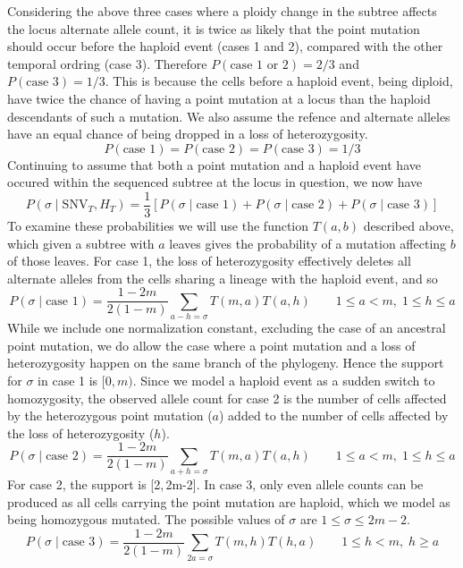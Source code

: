 \documentclass[../main.tex]{subfiles}
\begin{document}
Considering the above three cases where a ploidy change in the subtree affects the locus alternate allele count, it is twice as likely that the point mutation should occur before the haploid event (cases 1 and 2), compared with the other temporal ordring (case 3). Therefore $P(\text{case 1 or 2})=2/3$ and $P(\text{case 3})=1/3$. This is because the cells before a haploid event, being diploid, have twice the chance of having a point mutation at a locus than the haploid descendants of such a mutation. We also assume the refence and alternate alleles have an equal chance of being dropped in a loss of heterozygosity.
\begin{equation*}
P(\text{case 1})=P(\text{case 2}) = P(\text{case 3}) = 1/3
\end{equation*}
Continuing to assume that both a point mutation and a haploid event have occured within the sequenced subtree at the locus in question, we now have
\begin{equation*}
P(\sigma\mid\text{SNV}_T,H_T)=\frac{1}{3}\left[P(\sigma\mid\text{case 1})+P(\sigma\mid\text{case 2})+P(\sigma\mid\text{case 3})\right]
\end{equation*}
To examine these probabilities we will use the function $T(a,b)$ described above, which given a subtree with $a$ leaves gives the probability of a mutation affecting $b$ of those leaves. For case 1, the loss of heterozygosity effectively deletes all alternate alleles from the cells sharing a lineage with the haploid event, and so
\begin{equation*}
P(\sigma\mid\text{case 1}) = \frac{1-2m}{2(1-m)}\sum_{a-h=\sigma}T(m,a)T(a,h)\qquad 1\leq a < m,\;1\leq h\leq a
\end{equation*}
While we include one normalization constant, excluding the case of an ancestral point mutation, we do allow the case where a point mutation and a loss of heterozygosity happen on the same branch of the phylogeny. Hence the support for $\sigma$ in case 1 is $[0,m)$. Since we model a haploid event as a sudden switch to homozygosity, the observed allele count for case 2 is the number of cells affected by the heterozygous point mutation ($a$) added to the number of cells affected by the loss of heterozygosity ($h$).
\begin{equation*}
P(\sigma\mid\text{case 2}) = \frac{1-2m}{2(1-m)}\sum_{a+h=\sigma}T(m,a)T(a,h) \qquad 1\leq a < m,\;1\leq h\leq a
\end{equation*}
For case 2, the support is [2,\,2m-2]. In case 3, only even allele counts can be produced as all cells carrying the point mutation are haploid, which we model as being homozygous mutated. The possible values of $\sigma$ are $1\leq\sigma\leq 2m-2$.
\begin{equation*}
P(\sigma\mid\text{case 3}) = \frac{1-2m}{2(1-m)}\sum_{2a=\sigma} T(m,h)T(h,a) \qquad 1\leq h < m,\; h\geq a
\end{equation*}
\end{document}
